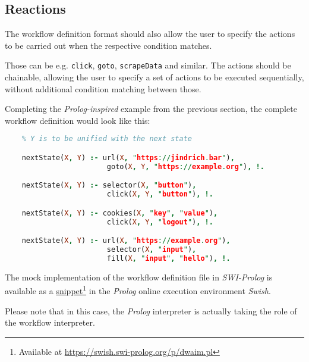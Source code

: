 \subsection{Reactions}

The workflow definition format should also allow the user to specify the actions to be carried out when the respective condition matches.

Those can be e.g. \texttt{click}, \texttt{goto}, \texttt{scrapeData} and similar. 
The actions should be chainable, allowing the user to specify a set of actions to be executed sequentially, without additional condition matching between those.

Completing the \textit{Prolog-inspired} example from the previous section, the complete workflow definition would look like this:

\begin{minipage}{0.95\linewidth}
\begin{lstlisting}[language=prolog, columns=spaceflexible]
    % X is denoting the current state of the browser
    % Y is to be unified with the next state

    nextState(X, Y) :- url(X, "https://jindrich.bar"),
                        goto(X, Y, "https://example.org"), !.

    nextState(X, Y) :- selector(X, "button"),
                        click(X, Y, "button"), !.

    nextState(X, Y) :- cookies(X, "key", "value"),
                        click(X, Y, "logout"), !.

    nextState(X, Y) :- url(X, "https://example.org"),
                        selector(X, "input"),
                        fill(X, "input", "hello"), !.

\end{lstlisting}
\end{minipage}

\emptyline

The mock implementation of the workflow definition file in \textit{SWI-Prolog} is available as a \href{https://swish.swi-prolog.org/p/dwaim.pl}{snippet}\footnote{Available at \url{https://swish.swi-prolog.org/p/dwaim.pl}} in the \textit{Prolog} online execution environment \textit{Swish}. 

Please note that in this case, the \textit{Prolog} interpreter is actually taking the role of the workflow interpreter.


